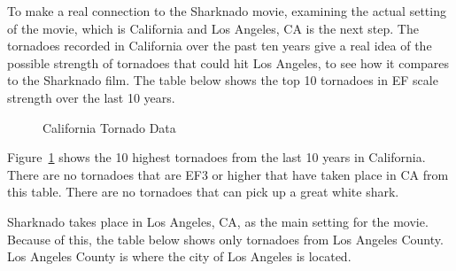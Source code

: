 \documentclass[
  letterpaper,
  DIV=11,
  numbers=noendperiod]{scrreprt}
\begin{document}
To make a real connection to the Sharknado movie, examining the actual
setting of the movie, which is California and Los Angeles, CA is the
next step. The tornadoes recorded in California over the past ten years
give a real idea of the possible strength of tornadoes that could hit
Los Angeles, to see how it compares to the Sharknado film. The table
below shows the top 10 tornadoes in EF scale strength over the last 10
years.

\begin{figure}


\caption{\label{fig-table5}California Tornado Data}

\end{figure}%

Figure~\ref{fig-table5} shows the 10 highest tornadoes from the last 10
years in California. There are no tornadoes that are EF3 or higher that
have taken place in CA from this table. There are no tornadoes that can
pick up a great white shark.

Sharknado takes place in Los Angeles, CA, as the main setting for the
movie. Because of this, the table below shows only tornadoes from Los
Angeles County. Los Angeles County is where the city of Los Angeles is
located.
\end{document}
